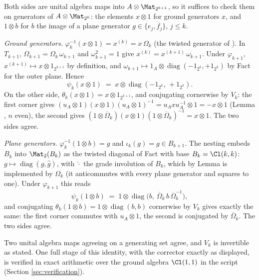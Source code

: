 Both sides are unital algebra maps into $A \otimes \Mat_{2^{k+1}}$, so it suffices to check them on generators of $A \otimes \Mat_{2^k}$: the elements $x \otimes 1$ for ground generators $x$, and $1 \otimes b$ for $b$ the image of a plane generator $g \in \{e_j, f_j\}$, $j \leq k$.

\emph{Ground generators.} $\varphi_k^{-1}(x \otimes 1) = x^{(k)} = x\,\Omega_k$ (the twisted generator of ). In $T_{k+1}$, $\Omega_{k+1} = \Omega_k\, \omega_{k+1}$ and $\omega_{k+1}^2 = 1$ give $x^{(k)} = x^{(k+1)}\, \omega_{k+1}$. Under $\varphi_{k+1}$, $x^{(k+1)} \mapsto x \otimes 1_{2^{k+1}}$ by definition, and $\omega_{k+1} \mapsto 1_A \otimes \operatorname{diag}(-1_{2^k}, +1_{2^k})$ by Fact  for the outer plane. Hence
\[
\psi_k(x \otimes 1) \;=\; x \otimes \operatorname{diag}(-1_{2^k},\, +1_{2^k}).
\]
On the other side, $\theta_k(x \otimes 1) = x \otimes 1_{2^{k+1}}$, and conjugating cornerwise by $V_k$: the first corner gives $(u_A \otimes 1)(x \otimes 1)(u_A \otimes 1)^{-1} = u_A x u_A^{-1} \otimes 1 = -x \otimes 1$ (Lemma , $n$ even), the second gives $(1 \otimes \overline\Omega_k)(x \otimes 1)(1 \otimes \overline\Omega_k)^{-1} = x \otimes 1$. The two sides agree.

\emph{Plane generators.} $\varphi_k^{-1}(1 \otimes b) = g$ and $\iota_k(g) = g \in B_{k+1}$. The nesting embeds $B_k$ into $\Mat_2(B_k)$ as the twisted diagonal of Fact  with base $B_k = \Cl(k,k)$: $g \mapsto \operatorname{diag}(g, \hat g)$, with $\hat{\cdot}$ the grade involution of $B_k$, which by Lemma  is implemented by $\Omega_k$ (it anticommutes with every plane generator and squares to one). Under $\varphi_{k+1}$ this reads
\[
\psi_k(1 \otimes b) \;=\; 1 \otimes \operatorname{diag}\bigl(b,\ \overline\Omega_k\, b\, \overline\Omega_k^{-1}\bigr),
\]
and conjugating $\theta_k(1 \otimes b) = 1 \otimes \operatorname{diag}(b, b)$ cornerwise by $V_k$ gives exactly the same: the first corner commutes with $u_A \otimes 1$, the second is conjugated by $\overline\Omega_k$. The two sides agree.

Two unital algebra maps agreeing on a generating set agree, and $V_k$ is invertible as stated. One full stage of this identity, with the corrector exactly as displayed, is verified in exact arithmetic over the ground algebra $\Cl(1,1)$ in the script (Section \ref{sec:verification}).
